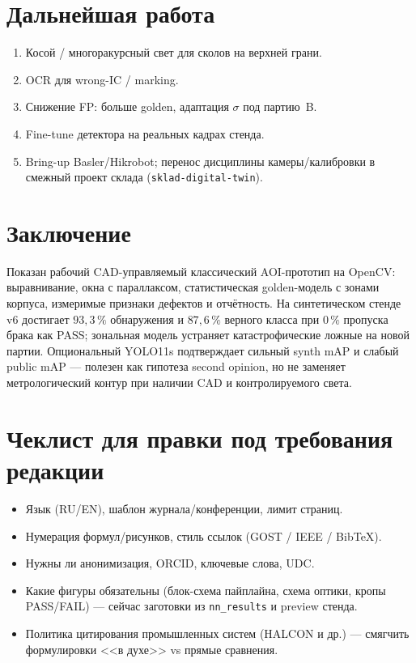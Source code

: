 \documentclass[12pt,a4paper]{article}
\begin{document}
\section{Дальнейшая работа}
\label{sec:future}

\begin{enumerate}[leftmargin=1.5em]
  \item Косой / многоракурсный свет для сколов на верхней грани.
  \item OCR для wrong-IC / marking.
  \item Снижение FP: больше golden, адаптация \(\sigma\) под партию~B.
  \item Fine-tune детектора на реальных кадрах стенда.
  \item Bring-up Basler/Hikrobot; перенос дисциплины камеры/калибровки
        в смежный проект склада (\texttt{sklad-digital-twin}).
\end{enumerate}

\section{Заключение}

Показан рабочий CAD-управляемый классический AOI-прототип на OpenCV:
выравнивание, окна с параллаксом, статистическая golden-модель с зонами
корпуса, измеримые признаки дефектов и отчётность. На синтетическом стенде
v6 достигает \(93{,}3\,\%\) обнаружения и \(87{,}6\,\%\) верного класса при
\(0\,\%\) пропуска брака как PASS; зональная модель устраняет катастрофические
ложные на новой партии. Опциональный YOLO11s подтверждает сильный synth
mAP и слабый public mAP --- полезен как гипотеза second opinion, но не
заменяет метрологический контур при наличии CAD и контролируемого света.

\section*{Чеклист для правки под требования редакции}
\begin{itemize}[leftmargin=1.5em]
  \item Язык (RU/EN), шаблон журнала/конференции, лимит страниц.
  \item Нумерация формул/рисунков, стиль ссылок (GOST / IEEE / BibTeX).
  \item Нужны ли анонимизация, ORCID, ключевые слова, UDC.
  \item Какие фигуры обязательны (блок-схема пайплайна, схема оптики,
        кропы PASS/FAIL) --- сейчас заготовки из \texttt{nn\_results} и
        preview стенда.
  \item Политика цитирования промышленных систем (HALCON и др.) --- смягчить
        формулировки <<в духе>> vs прямые сравнения.
\end{itemize}
\end{document}
